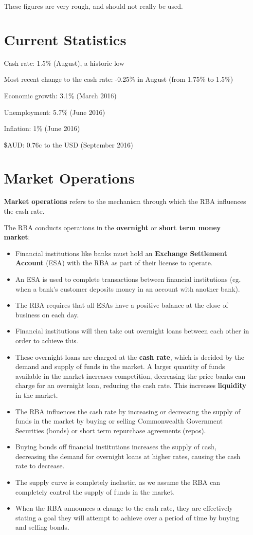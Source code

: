 \documentclass[a4paper,11pt]{report}
\begin{document}
These figures are very rough, and should not really be used.


\section{Current Statistics}

Cash rate: 1.5\% (August), a historic low

Most recent change to the cash rate: -0.25\% in August (from 1.75\% to 1.5\%)

Economic growth: 3.1\% (March 2016)

Unemployment: 5.7\% (June 2016)

Inflation: 1\% (June 2016)

\$AUD: 0.76c to the USD (September 2016)


\section{Market Operations}

\textbf{Market operations} refers to the mechanism through which the RBA
influences the cash rate.

The RBA conducts operations in the \textbf{overnight} or \textbf{short term
money market}:

\begin{itemize}
\item Financial institutions like banks must hold an \textbf{Exchange Settlement
	Account} (ESA) with the RBA as part of their license to operate.
\item An ESA is used to complete transactions between financial institutions
	(eg. when a bank's customer deposits money in an account with another bank).
\item The RBA requires that all ESAs have a positive balance at the close of
	business on each day.
\item Financial institutions will then take out overnight loans between each
	other in order to achieve this.
\item These overnight loans are charged at the \textbf{cash rate}, which is
	decided by the demand and supply of funds in the market. A larger quantity
	of funds available in the market increases competition, decreasing the price
	banks can charge for an overnight loan, reducing the cash rate. This
	increases \textbf{liquidity} in the market.
\item The RBA influences the cash rate by increasing or decreasing the supply
	of funds in the market by buying or selling Commonwealth Government
	Securities (bonds) or short term repurchase agreements (repos).
\item Buying bonds off financial institutions increases the supply of cash,
	decreasing the demand for overnight loans at higher rates, causing the
	cash rate to decrease.
\item The supply curve is completely inelastic, as we assume the RBA can
	completely control the supply of funds in the market.
\item When the RBA announces a change to the cash rate, they are effectively
	stating a goal they will attempt to achieve over a period of time by buying
	and selling bonds.
\end{itemize}
\end{document}
